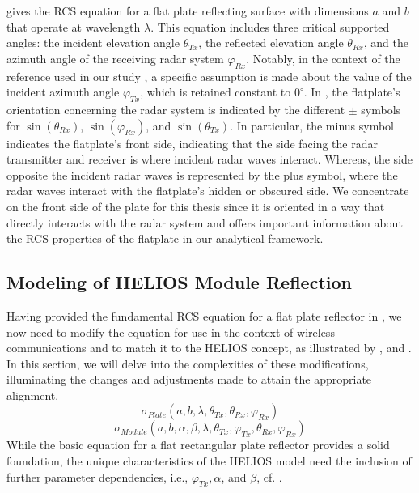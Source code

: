  gives the \ac{RCS} equation for a flat plate reflecting surface with dimensions $a$ and $b$ that operate at wavelength $\lambda$. This equation includes three critical supported angles: the incident elevation angle $\theta_{Tx}$, the reflected elevation angle $\theta_{Rx}$, and the azimuth angle of the receiving radar system $\varphi_{Rx}$. Notably, in the context of the reference used in our study \cite{Balanis}, a specific assumption is made about the value of the incident azimuth angle $\varphi_{Tx}$, which is retained constant to $0^\circ$. In , the flatplate's orientation concerning the radar system is indicated by the different $\pm$ symbols for $\sin(\theta_{Rx})$, $\sin(\varphi_{Rx})$, and $\sin(\theta_{Tx})$. In particular, the minus symbol indicates the flatplate's front side, indicating that the side facing the radar transmitter and receiver is where incident radar waves interact. Whereas, the side opposite the incident radar waves is represented by the plus symbol, where the radar waves interact with the flatplate's hidden or obscured side. We concentrate on the front side of the plate for this thesis since it is oriented in a way that directly interacts with the radar system and offers important information about the RCS properties of the flatplate in our analytical framework.
\subsection{Modeling of HELIOS Module Reflection} \label{Transfer and Adaption of Model to HELIOS Modules}
Having provided the fundamental \ac{RCS} equation for a flat plate reflector in , we now need to modify the equation for use in the context of wireless communications and to match it to the HELIOS concept, as illustrated by , and . In this section, we will delve into the complexities of these modifications, illuminating the changes and adjustments made to attain the appropriate alignment.
\begin{equation}\label{Eq:RCS_flatplate_dependency}
	\sigma_{Plate}(a, b, \lambda, \theta_{Tx}, \theta_{Rx}, \varphi_{Rx})
\end{equation}
\begin{equation}\label{Eq:RCS_HELIOS_dependency}
	\sigma_{Module}(a, b, \alpha, \beta, \lambda, \theta_{Tx}, \varphi_{Tx}, \theta_{Rx}, \varphi_{Rx})
\end{equation}
While the basic equation for a flat rectangular plate reflector provides a solid foundation, the unique characteristics of the HELIOS model need the inclusion of further parameter dependencies, i.e., $\varphi_{Tx}, \alpha$, and $\beta$, cf. . 

